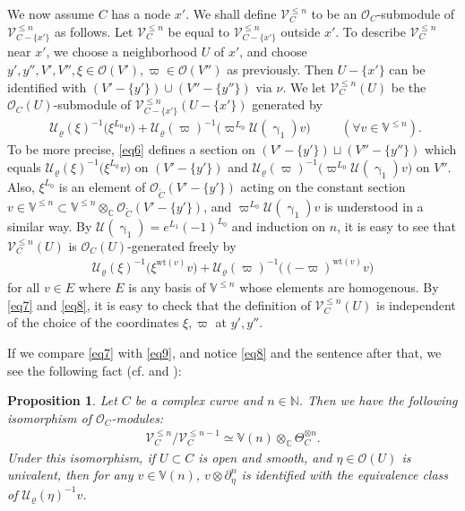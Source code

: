 \documentclass[12pt,a4paper,notitlepage]{article}
\theoremstyle{definition}
\theoremstyle{plain}
\newtheorem{pp}[df]{Proposition}
\newcommand{\mc}{\mathcal}
\newcommand{\wtd}{\widetilde}
\newcommand{\scr}{\mathscr}
\newcommand{\Vbb}{\mathbb V}
\newcommand{\Cbb}{\mathbb C}
\newcommand{\Nbb}{\mathbb N}
\newcommand{\wt}{\mathrm{wt}}
\numberwithin{equation}{section}
\begin{document}
We now assume $C$ has a node $x'$. We shall define $\scr V_C^{\leq n}$ to be an $\scr O_C$-submodule of $\scr V^{\leq n}_{C-\{x'\}}$ as follows. Let $\scr V_C^{\leq n}$ be equal to $\scr V^{\leq n}_{C-\{x'\}}$ outside $x'$. To describe $\scr V_C^{\leq n}$ near $x'$, we choose a neighborhood $U$ of $x'$, and choose $y',y'',V',V'',\xi\in\scr O(V'),\varpi\in\scr O(V'')$ as previously. Then $U-\{x'\}$ can be identified with $(V'-\{y'\})\cup (V''-\{y''\})$ via $\nu$. We let $\scr V_C^{\leq n}(U)$ be the $\scr O_C(U)$-submodule of $\scr V_{C-\{x'\}}^{\leq n}(U-\{x'\})$ generated by
\begin{align}
\boxed{~~\mc U_\varrho(\xi)^{-1}\big(\xi^{L_0}v\big)+\mc U_\varrho(\varpi)^{-1}\big(\varpi^{L_0}\mc U(\upgamma_1)v\big)~~}\qquad (\forall v\in\Vbb^{\leq n}).\label{eq6}
\end{align}
To be more precise, \eqref{eq6} defines a section on $(V'-\{y'\})\sqcup (V''-\{y''\})$ which equals $\mc U_\varrho(\xi)^{-1}\big(\xi^{L_0}v\big)$ on $(V'-\{y'\})$ and $\mc U_\varrho(\varpi)^{-1}\big(\varpi^{L_0}\mc U(\upgamma_1)v\big)$ on $V''$. Also, $\xi^{L_0}$ is an element of $\scr O_{\wtd C}(V'-\{y'\})$ acting on the constant section $v\in\Vbb^{\leq n}\subset\Vbb^{\leq n}\otimes_{\Cbb}\scr O_{\wtd C}(V'-\{y'\})$, and $\varpi^{L_0}\mc U(\upgamma_1)v$ is understood in a similar way.  By $\mc U(\upgamma_1)=e^{L_1}(-1)^{L_0}$ and induction on $n$, it is easy to see that $\scr V_C^{\leq n}(U)$ is $\scr O_C(U)$-generated freely by
\begin{align}
\mc U_\varrho(\xi)^{-1}\big(\xi^{\wt (v)}v\big)+\mc U_\varrho(\varpi)^{-1}\big((-\varpi)^{\wt(v)}v\big)\label{eq7}
\end{align}
for all $v\in E$ where $E$ is any basis of $\Vbb^{\leq n}$ whose elements are homogenous. By \eqref{eq7} and \eqref{eq8}, it is easy to check that the definition of $\scr V_C^{\leq n}(U)$ is independent of the choice of the coordinates $\xi,\varpi$ at $y',y''$. 

If we compare \eqref{eq7} with \eqref{eq9}, and notice \eqref{eq8} and the sentence after that, we see the following fact (cf. \cite[Sec.6.5.9]{FB04} and \cite{DGT19b}):

\begin{pp}\label{lb3}
Let $C$ be a complex curve and $n\in\Nbb$. Then we have the following isomorphism of  $\scr O_C$-modules:
\begin{align*}
\scr V_C^{\leq n}/\scr V_C^{\leq n-1}\simeq\Vbb(n)\otimes_{\Cbb}\Theta_C^{\otimes n}.
\end{align*}
Under this isomorphism, if $U\subset C$ is open and smooth, and $\eta\in\scr O(U)$ is univalent, then for any $v\in\Vbb(n)$, $v\otimes \partial_\eta^n$ is identified with the equivalence class of $\mc U_\varrho(\eta)^{-1}v$.
\end{pp}
\end{document}
